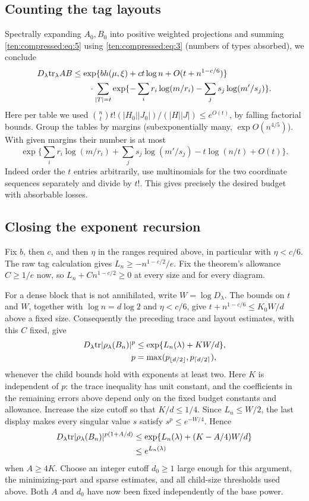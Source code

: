 \subsection{Counting the tag layouts}
Spectrally expanding \(A_0,B_0\) into positive weighted projections and summing \eqref{ten:compressed:eq:5} using \eqref{ten:compressed:eq:3} (numbers of types absorbed), we conclude
\[
 \begin{split}
 D_\lambda {\rm tr}_\lambda AB
 &\le \exp\{b h(\mu,\xi)+c t\log n+O(t+n^{1-c/6})\}\\
 &\qquad{}\cdot \sum_{|T|=t}\exp\{-\sum_i r_i\log(m/r_i)-\sum_j s_j\log(m'/s_j)\}.
 \end{split}
\]
Here per table we used \(\binom nt t!(|H_0||J_0|)/(|H||J|)\le e^{O(t)}\), by falling factorial bounds. Group the tables by margins (subexponentially many, \(\exp O(n^{4/5})\)). With given margins their number is at most
\[
 \exp\{\sum_i r_i\log(m/r_i)+\sum_j s_j\log(m'/s_j)-t\log(n/t)+O(t)\}.
\]
Indeed order the \(t\) entries arbitrarily, use multinomials for the two coordinate sequences separately and divide by \(t!\). This gives precisely the desired budget with absorbable losses.

\subsection{Closing the exponent recursion}
Fix \(b\), then \(c\), and then \(\eta\) in the ranges required above, in particular with \(\eta<c/6\). The raw tag calculation gives
\(L_n\ge-n^{1-c/2}/e\). Fix the theorem's allowance \(C\ge1/e\) now, so
\(L_n+C n^{1-c/2}\ge0\) at every size and for every diagram.

For a dense block that is not annihilated, write \(W=\log D_\lambda\). The bounds on \(t\) and \(W\), together with \(\log n=d\log2\) and \(\eta<c/6\), give
\(t+n^{1-c/6}\le K_0W/d\) above a fixed size. Consequently the preceding trace and layout estimates, with this \(C\) fixed, give
\[
 \begin{aligned}
 D_\lambda {\rm tr}|\rho_\lambda(B_n)|^p
 &\le \exp\{L_n(\lambda)+K W/d\},\\
 p&=\max(p_{\lfloor d/2\rfloor},p_{\lceil d/2\rceil}),
 \end{aligned}
\]
whenever the child bounds hold with exponents at least two. Here \(K\) is independent of \(p\): the trace inequality has unit constant, and the coefficients in the remaining errors above depend only on the fixed budget constants and allowance. Increase the size cutoff so that \(K/d\le1/4\). Since \(L_n\le W/2\), the last display makes every singular value \(s\) satisfy \(s^p\le e^{-W/4}\). Hence
\[
 \begin{aligned}
 D_\lambda {\rm tr}|\rho_\lambda(B_n)|^{p(1+A/d)}
 &\le \exp\{L_n(\lambda)+(K-A/4)W/d\}\\
 &\le e^{L_n(\lambda)}
 \end{aligned}
\]
when \(A\ge4K\). Choose an integer cutoff \(d_0\ge1\) large enough for this argument, the minimizing-part and sparse estimates, and all child-size thresholds used above. Both \(A\) and \(d_0\) have now been fixed independently of the base power.

